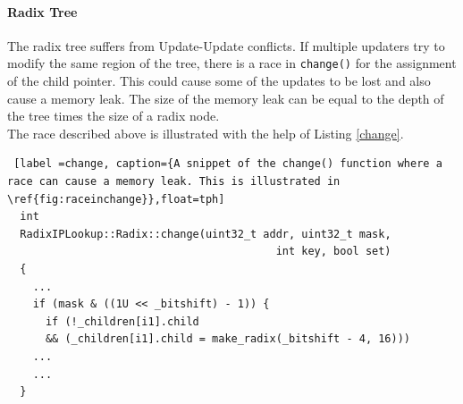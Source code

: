 \documentclass[a4paper,marginparwidth=50pt,marginparsep=10pt]{article}
\begin{document}
\paragraph{Radix Tree}
The radix tree suffers from Update-Update conflicts. If multiple updaters try to modify the same region of the tree, there is a race in \verb+change()+ for the assignment of the child pointer. This could cause some of the updates to be lost and also cause a memory leak. The size of the memory leak can be equal to the depth of the tree times the size of a radix node.\\

The race described above is illustrated with the help of Listing \ref{change}.
\begin{lstlisting} [label =change, caption={A snippet of the change() function where a race can cause a memory leak. This is illustrated in \ref{fig:raceinchange}},float=tph]
  int
  RadixIPLookup::Radix::change(uint32_t addr, uint32_t mask,
                                          int key, bool set)
  {
    ...
    if (mask & ((1U << _bitshift) - 1)) {
      if (!_children[i1].child
      && (_children[i1].child = make_radix(_bitshift - 4, 16)))
    ...
    ...
  }
\end{lstlisting}
\end{document}

